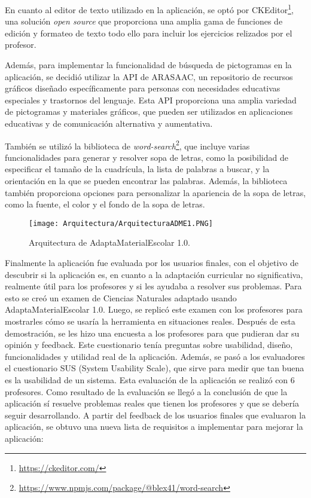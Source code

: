 En cuanto al editor de texto utilizado en la aplicación, se optó por CKEditor\footnote{\url{https://ckeditor.com/}}, una solución \textit{open source} que proporciona una amplia gama de funciones de edición y formateo de texto todo ello para incluir los ejercicios relizados por el profesor.

Además, para implementar la funcionalidad de búsqueda de pictogramas en la aplicación, se decidió utilizar la API de ARASAAC, un repositorio de recursos gráficos diseñado específicamente para personas con necesidades educativas especiales y trastornos del lenguaje. Esta API proporciona una amplia variedad de pictogramas y materiales gráficos, que pueden ser utilizados en aplicaciones educativas y de comunicación alternativa y aumentativa.

También se utilizó la biblioteca de \textit{word-search}\footnote{\url{https://www.npmjs.com/package/@blex41/word-search}}, que incluye varias funcionalidades para generar y resolver sopa de letras, como la posibilidad de especificar el tamaño de la cuadrícula, la lista de palabras a buscar, y la orientación en la que se pueden encontrar las palabras. Además, la biblioteca también proporciona opciones para personalizar la apariencia de la sopa de letras, como la fuente, el color y el fondo de la sopa de letras.

\begin{figure}[ht!]
  \centering
  \texttt{[image: Arquitectura/ArquitecturaADME1.PNG]}
  \caption{Arquitectura de AdaptaMaterialEscolar 1.0.
  }
  \label{arquitecturaADME1}
\end{figure}


Finalmente la aplicación fue evaluada por los usuarios finales, con el objetivo de descubrir si la aplicación es, en cuanto a la adaptación curricular no significativa, realmente útil para los profesores y si les ayudaba a resolver sus problemas. Para esto se creó un examen de Ciencias Naturales adaptado usando AdaptaMaterialEscolar 1.0. Luego, se replicó este examen con los profesores para mostrarles cómo se usaría la herramienta en situaciones reales. Después de esta demostración, se les hizo una encuesta a los profesores para que pudieran dar su opinión y feedback. Este cuestionario tenía preguntas sobre usabilidad, diseño, funcionalidades y utilidad real de la aplicación. Además, se pasó a los evaluadores el cuestionario SUS (System Usability Scale), que sirve para medir que tan buena es la usabilidad de un sistema. Esta evaluación de la aplicación se realizó con 6 profesores. Como resultado de la evaluación se llegó a la conclusión de que la aplicación sí resuelve problemas reales que tienen los profesores y que se debería seguir desarrollando. A partir del feedback de los usuarios finales que evaluaron la aplicación, se obtuvo una nueva lista de requisitos a implementar para mejorar la aplicación:

